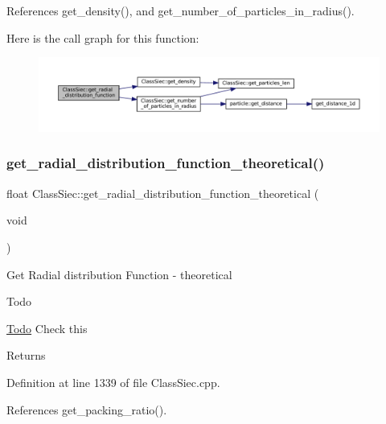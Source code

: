 References get\+\_\+density(), and get\+\_\+number\+\_\+of\+\_\+particles\+\_\+in\+\_\+radius().

Here is the call graph for this function\+:
\nopagebreak
\begin{figure}[H]
\begin{center}
\leavevmode
\includegraphics[width=350pt]{classClassSiec_a95685407da49bfa4d1a54fd248e8aee3_cgraph}
\end{center}
\end{figure}
\mbox{\label{classClassSiec_a87284d96c487a462bf8a42d81fc4bb8c}} 
\subsubsection{\texorpdfstring{get\+\_\+radial\+\_\+distribution\+\_\+function\+\_\+theoretical()}{get\_radial\_distribution\_function\_theoretical()}}
{\footnotesize\ttfamily float Class\+Siec\+::get\+\_\+radial\+\_\+distribution\+\_\+function\+\_\+theoretical (\begin{DoxyParamCaption}\item[{void}]{ }\end{DoxyParamCaption})}

Get Radial distribution Function -\/ theoretical \begin{DoxyRefDesc}{Todo}
\item[\mbox{\hyperlink{todo__todo000005}{Todo}}]Check this \end{DoxyRefDesc}
\begin{DoxyReturn}{Returns}

\end{DoxyReturn}


Definition at line 1339 of file Class\+Siec.\+cpp.



References get\+\_\+packing\+\_\+ratio().



